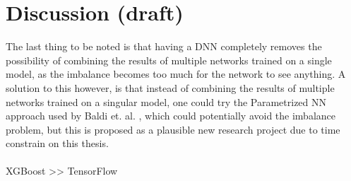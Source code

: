 \documentclass[12pt, a4paper]{book}
\begin{document}
\section{Discussion (draft)}
The last thing to be noted is that having a DNN completely removes the possibility of combining the results of multiple networks trained on a single model, as the imbalance becomes too much for the network to see anything.
A solution to this however, is that instead of combining the results of multiple networks trained on a singular model, one could try the Parametrized NN approach used by Baldi et. al. \cite{Baldi_2016}, which could potentially avoid the imbalance problem, but this is 
proposed as a plausible new research project due to time constrain on this thesis.\\
\\ XGBoost >> TensorFlow
\end{document}

